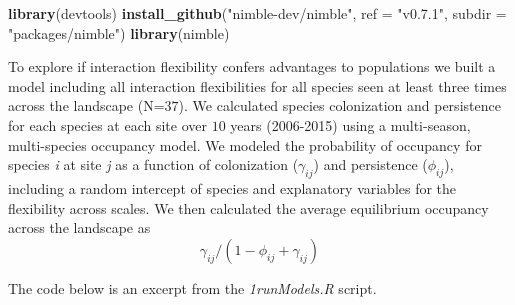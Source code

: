 \documentclass[
]{article}
\newenvironment{Shaded}{\begin{snugshade}}{\end{snugshade}}
\newcommand{\DataTypeTok}[1]{\textcolor[rgb]{0.13,0.29,0.53}{#1}}
\newcommand{\KeywordTok}[1]{\textcolor[rgb]{0.13,0.29,0.53}{\textbf{#1}}}
\newcommand{\NormalTok}[1]{#1}
\newcommand{\StringTok}[1]{\textcolor[rgb]{0.31,0.60,0.02}{#1}}
\begin{document}
\begin{Shaded}
\begin{Highlighting}[]
\KeywordTok{library}\NormalTok{(devtools)}
\KeywordTok{install\_github}\NormalTok{(}\StringTok{"nimble{-}dev/nimble"}\NormalTok{, }\DataTypeTok{ref =} \StringTok{"v0.7.1"}\NormalTok{, }\DataTypeTok{subdir =} \StringTok{"packages/nimble"}\NormalTok{)}
\KeywordTok{library}\NormalTok{(nimble)}
\end{Highlighting}
\end{Shaded}

To explore if interaction flexibility confers advantages to populations
we built a model including all interaction flexibilities for all species
seen at least three times across the landscape (N=\(37\)). We calculated
species colonization and persistence for each species at each site over
\(10\) years (2006-2015) using a multi-season, multi-species occupancy
model. We modeled the probability of occupancy for species \textit{i} at
site \textit{j} as a function of colonization (\(\gamma_{ij}\)) and
persistence (\(\phi_{ij}\)), including a random intercept of species and
explanatory variables for the flexibility across scales. We then
calculated the average equilibrium occupancy across the landscape as
\[\gamma_{ij}/(1-\phi_{ij} + \gamma_{ij})\]

The code below is an excerpt from the \emph{1runModels.R} script.
\end{document}
